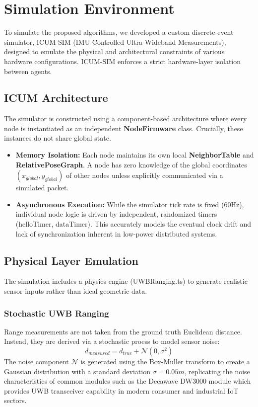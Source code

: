\section{Simulation Environment}
\noindent To simulate the proposed algorithms, we developed a custom discrete-event simulator, ICUM-SIM (IMU Controlled Ultra-Wideband Measurements), designed to emulate the physical and architectural constraints of various hardware configurations. ICUM-SIM enforces a strict hardware-layer isolation between agents.

\subsection{ICUM Architecture}
\noindent The simulator is constructed using a component-based architecture where every node is instantiated as an independent \textbf{NodeFirmware} class. Crucially, these instances do not share global state.
\begin{itemize}
    \item \textbf{Memory Isolation:} Each node maintains its own local \textbf{NeighborTable} and \textbf{RelativePoseGraph}. A node has zero knowledge of the global coordinates $(x_{global},y_{global})$ of other nodes unless explicitly communicated via a simulated packet.\\
    \item \textbf{Asynchronous Execution:} While the simulator tick rate is fixed (60Hz), individual node logic is driven by independent, randomized timers (helloTimer, dataTimer). This accurately models the eventual clock drift and lack of synchronization inherent in low-power distributed systems.
\end{itemize}

\subsection{Physical Layer Emulation}
\noindent The simulation includes a physics engine (UWBRanging.ts) to generate realistic sensor inputs rather than ideal geometric data.

\subsubsection{Stochastic UWB Ranging}
\noindent Range measurements are not taken from the ground truth Euclidean distance. Instead, they are derived via a stochastic proess to model sensor noise:
\begin{equation}
    d_{measured} = d_{true} + \mathcal{N}(0, \sigma^2)
\end{equation}
The noise component $\mathcal{N}$ is generated using the Box-Muller transform to create a Gaussian distribution with a standard deviation $\sigma = 0.05m$, replicating the noise characteristics of common modules such as the Decawave DW3000 module which provides UWB transceiver capability in modern consumer and industrial IoT sectors.

